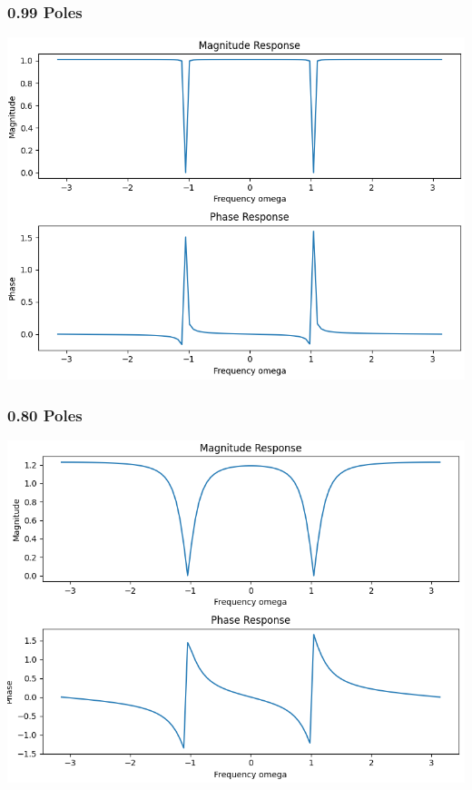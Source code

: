 \documentclass[12pt,letterpaper]{article}
\begin{document}
\subsubsection*{0.99 Poles}
\includegraphics*[scale=0.3]{p1p5p1.png}
\subsubsection*{0.80 Poles}
\includegraphics*[scale=0.3]{p1p5p2.png}
\newpage
\end{document}
